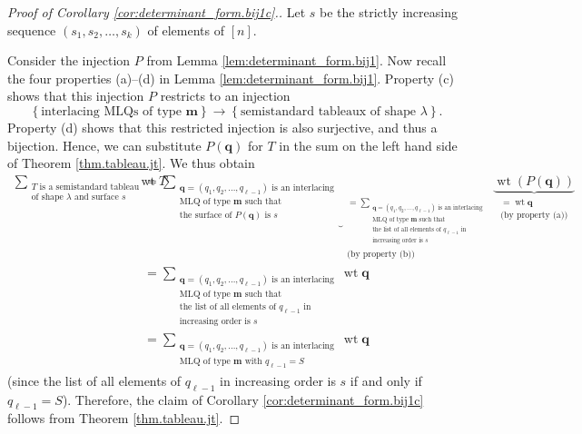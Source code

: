 \documentclass[reqno]{amsart}
\newcommand{\0}{\phantom{c}}
\let\sumnonlimits\sum
\renewcommand{\sum}{\sumnonlimits\limits}
\theoremstyle{plain}
\theoremstyle{definition}
\numberwithin{equation}{section}
\begin{document}
\begin{proof}
[Proof of Corollary \ref{cor:determinant_form.bij1c}.]Let $s$ be the strictly
increasing sequence $\left(  s_{1},s_{2},\ldots,s_{k}\right)  $ of elements of
$\left[  n\right]  $.

Consider the injection $P$ from Lemma \ref{lem:determinant_form.bij1}. Now
recall the four properties (a)--(d) in Lemma \ref{lem:determinant_form.bij1}.
Property (c) shows that this injection $P$ restricts to an injection%
\[
\left\{  \text{interlacing MLQs of type }\mathbf{m}\right\}  \rightarrow
\left\{  \text{semistandard tableaux of shape }\lambda\right\}  .
\]
Property (d) shows that this restricted injection is also surjective, and thus
a bijection. Hence, we can substitute $P\left(  \mathbf{q}\right)  $ for $T$
in the sum on the left hand side of Theorem \ref{thm.tableau.jt}. We thus
obtain%
\begin{align*}
\sum_{\substack{T\text{ is a semistandard tableau}\\\text{of shape }%
\lambda\text{ and surface }s}}\operatorname*{wt}T &  =\underbrace{\sum
_{\substack{\mathbf{q}=\left(  q_{1},q_{2},\ldots,q_{\ell-1}\right)  \text{ is
an interlacing}\\\text{MLQ of type }\mathbf{m}\text{ such that}\\\text{the
surface of }P\left(  \mathbf{q}\right)  \text{ is }s}}}_{\substack{=\sum
_{\substack{\mathbf{q}=\left(  q_{1},q_{2},\ldots,q_{\ell-1}\right)  \text{ is
an interlacing}\\\text{MLQ of type }\mathbf{m}\text{ such that}\\\text{the
list of all elements of }q_{\ell-1}\text{ in}\\\text{increasing order is }%
s}}\\\text{(by property (b))}}}\underbrace{\operatorname*{wt}\left(  P\left(
\mathbf{q}\right)  \right)  }_{\substack{=\operatorname*{wt}\mathbf{q}%
\\\text{(by property (a))}}}\\
&  =\sum_{\substack{\mathbf{q}=\left(  q_{1},q_{2},\ldots,q_{\ell-1}\right)
\text{ is an interlacing}\\\text{MLQ of type }\mathbf{m}\text{ such
that}\\\text{the list of all elements of }q_{\ell-1}\text{ in}%
\\\text{increasing order is }s}}\operatorname*{wt}\mathbf{q}\\
&  =\sum_{\substack{\mathbf{q}=\left(  q_{1},q_{2},\ldots,q_{\ell-1}\right)
\text{ is an interlacing}\\\text{MLQ of type }\mathbf{m}\text{ with }%
q_{\ell-1}=S}}\operatorname*{wt}\mathbf{q}%
\end{align*}
(since the list of all elements of $q_{\ell-1}$ in increasing order is $s$ if
and only if $q_{\ell-1}=S$). Therefore, the claim of Corollary
\ref{cor:determinant_form.bij1c} follows from Theorem \ref{thm.tableau.jt}.
\end{proof}
\end{document}
